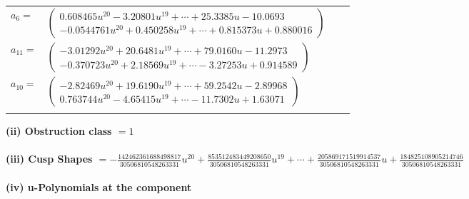 \documentclass[1p]{elsarticle_modified}
\theoremstyle{definition}
\begin{document}
\begin{tabular}{m{7pt} m{180pt} m{7pt} m{180pt} }
\flushright $a_{6}=$&$\begin{pmatrix}0.608465 u^{20}-3.20801 u^{19}+\cdots+25.3385 u-10.0693\\-0.0544761 u^{20}+0.450258 u^{19}+\cdots+0.815373 u+0.880016\end{pmatrix}$ \\
\flushright $a_{11}=$&$\begin{pmatrix}-3.01292 u^{20}+20.6481 u^{19}+\cdots+79.0160 u-11.2973\\-0.370723 u^{20}+2.18569 u^{19}+\cdots-3.27253 u+0.914589\end{pmatrix}$ \\
\flushright $a_{10}=$&$\begin{pmatrix}-2.82469 u^{20}+19.6190 u^{19}+\cdots+59.2542 u-2.89968\\0.763744 u^{20}-4.65415 u^{19}+\cdots-11.7302 u+1.63071\end{pmatrix}$\\&\end{tabular}
\flushleft \textbf{(ii) Obstruction class $= 1$}\\~\\
\flushleft \textbf{(iii) Cusp Shapes $= -\frac{142462361688498817}{30506810548263331} u^{20}+\frac{853512483449208650}{30506810548263331} u^{19}+\cdots+\frac{205869171519914537}{30506810548263331} u+\frac{184825108905214746}{30506810548263331}$}\\~\\
\newpage\renewcommand{\arraystretch}{1}
\flushleft \textbf{(iv) u-Polynomials at the component}\newline \\
\end{document}
